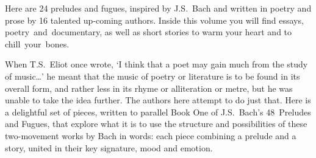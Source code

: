 Here are 24 preludes and fugues, inspired by J.S.~Bach and written in
poetry and prose by 16 talented up-coming authors. Inside this volume
you will find essays, poetry~and~documentary, as well as short stories to
warm your heart and to chill~your~bones.

When T.S.~Eliot once wrote, `I think that a poet may gain much from
the study of music\ldots' he meant that the music of poetry or
literature is to be found in its overall form, and rather less in 
its rhyme or alliteration or metre, but he was unable to take
the idea further. The authors here attempt to do just that.  Here is a
delightful set of pieces, written to parallel Book One of J.S.~Bach's
48~Preludes and Fugues, that explore what it is to use the structure and
possibilities of these two-movement works by Bach in words: each piece
combining a prelude and a story, united in their key
signature, mood and emotion.

